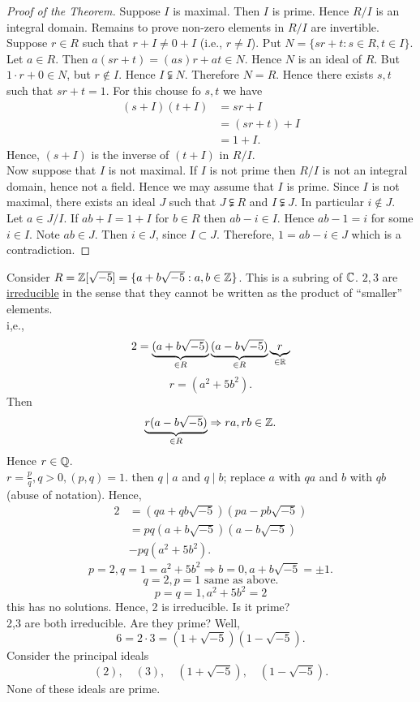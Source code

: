 \documentclass[twoside, openright, fontsize=10pt, headings=big]{scrbook}
\begin{document}
\begin{proof}[Proof of the Theorem]
    Suppose $I$ is maximal. Then $I$ is prime. Hence $R/I$ is an integral domain. Remains to prove non-zero elements in $R/I$ are invertible.\\
    Suppose $r\in R$ such that $r+I\neq 0+I$ (i.e., $r\neq I$). Put $N=\{sr+t:s\in R, t\in I\}$. Let $a\in R$. Then $a(sr+t)=(as)r+at\in N$. Hence $N$ is an ideal of $R$. But $1\cdot r+0\in N$, but $r\not\in I$. Hence $I\subsetneqq N$. Therefore $N=R$. Hence there exists $s,t$ such that $sr+t=1$. For this chouse fo $s,t$ we have 
    \begin{align*}
        (s+I)(t+I)&=sr+I\\
        &=(sr+t)+I\\
        &=1+I.
    \end{align*}
    Hence, $(s+I)$ is the inverse of $(t+I)$ in $R/I$.\\
    Now suppose that $I$ is not maximal. If $I$ is not prime then $R/I$ is not an integral domain, hence not a field. Hence we may assume that $I$ is prime. Since $I$ is not maximal, there exists an ideal $J$ such that $J\subsetneqq R$ and $I\subsetneqq J$. In particular $i\not\in J$. Let $a\in J/I$. If $ab+I=1+I$ for $b\in R$ then $ab-i\in I$. Hence $ab-1=i$ for some $i\in I$. Note $ab\in J$. Then $i\in J$, since $I\subset J$. Therefore, $1=ab-i\in J$ which is a contradiction.
\end{proof}
\begin{example}{}{}
    Consider $R=\mathbb{Z}[\sqrt{-5}]=\{a+b\sqrt{-5}:a,b\in\mathbb{Z}\}$. This is a subring of $\mathbb{C}$. $2,3$ are \underline{irreducible} in the sense that they cannot be written as the product of ``smaller'' elements.\\
    i,e.,
    \[
        2=\underbrace{(a+b\sqrt{-5})}_{\in R}\underbrace{(a-b\sqrt{-5})}_{\in R}\underbrace{r}_{\in\mathbb{R}}
    \] 
    \[
        r=(a^2+5b^2).
    \]
    Then
    \[
        \underbrace{r(a-b\sqrt{-5})}_{\in R}\Rightarrow ra,rb\in\mathbb{Z}.
    \]
    Hence $r\in\mathbb{Q}$.\\
    $r=\frac{p}{q},q>0,(p,q)=1$. then $q\mid a$ and $q\mid b$; replace $a$ with $qa$ and $b$ with $qb$ (abuse of notation). Hence,
    \begin{align*}
        2&=(qa+qb\sqrt{-5})(pa-pb\sqrt{-5})\\
        &=pq(a+b\sqrt{-5})(a-b\sqrt{-5})\\
        &-pq(a^2+5b^2).
    \end{align*}
    \[
        p=2,q=1=a^2+5b^2\Rightarrow b=0,a+b\sqrt{-5}=\pm1.
    \]
    \[
        q=2,p=1\text{ same as above.}
    \]
    \[
        p=q=1,a^2+5b^2=2
    \]
    this has no solutions. Hence, 2 is irreducible. Is it prime?\\
    2,3 are both irreducible. Are they prime? Well,
    \[
        6=2\cdot 3=(1+\sqrt{-5})(1-\sqrt{-5}).
    \]
    Consider the principal ideals
    \[
        (2),\quad (3),\quad (1+\sqrt{-5}),\quad (1-\sqrt{-5}).
    \]
    None of these ideals are prime.  
\end{example}
\end{document}
